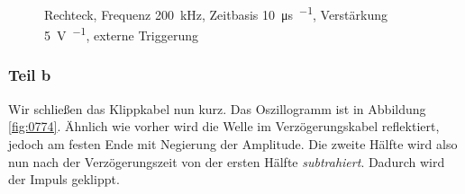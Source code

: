 \begin{figure}[htbp]
\begin{minipage}{.45\linewidth}
	\end{minipage}
	\caption{%
		Rechteck, Frequenz \SI{200}{\kilo\hertz},
		Zeitbasis \SI{10}{\micro\second\per\division},
		Verstärkung \SI{5}{\volt\per\division},
		externe Triggerung
	}
	\label{fig:0773}
\end{figure}

\FloatBarrier
\subsubsection{Teil b}

Wir schließen das Klippkabel nun kurz. Das Oszillogramm ist in Abbildung
\ref{fig:0774}. Ähnlich wie vorher wird die Welle im Verzögerungskabel
reflektiert, jedoch am festen Ende mit Negierung der Amplitude. Die zweite
Hälfte wird also nun nach der Verzögerungszeit von der ersten Hälfte
\emph{subtrahiert}. Dadurch wird der Impuls geklippt.

